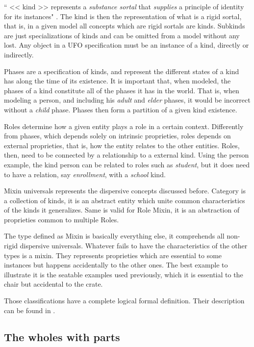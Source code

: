 `` << kind >> represents a \textit{substance sortal} that \textit{supplies} a principle of identity for its instances" \citep{guizzardi_ontological_2005}. The kind is then the representation of what is a rigid sortal, that is, in a given model all concepts which are rigid sortals are kinds. Subkinds are just specializations of kinds and can be omitted from a model without any lost. Any object in a UFO specification must be an instance of a kind, directly or indirectly.

Phases are a specification of kinds, and represent the different states of a kind has along the time of its existence. It is important that, when modeled, the phases of a kind constitute all of the phases it has in the world. That is, when modeling a person, and including his \textit{adult} and \textit{elder} phases, it would be incorrect without a \textit{child} phase. Phases then form a partition of a given kind existence.

Roles determine how a given entity plays a role in a certain context. Differently from phases, which depends solely on intrinsic proprieties, roles depends on external proprieties, that is, how the entity relates to the other entities. Roles, then, need to be connected by a relationship to a external  kind. Using the person example, the kind person can be related to roles such as \textit{student}, but it does need to have a relation, say \textit{enrollment}, with a \textit{school} kind. 

Mixin universals represents the dispersive concepts discussed before. Category is a collection of kinds, it is an abstract entity which unite common characteristics of the kinds it generalizes. Same is valid for Role Mixin, it is an abstraction of proprieties common to multiple Roles. 

The type defined as Mixin is basically everything else, it comprehends all non-rigid dispersive universals. Whatever fails to have the characteristics of the other types is a mixin. They represents proprieties which are essential to some instances but happens accidentally to the other ones. The best example to illustrate it is the seatable examples used previously, which it is essential to the chair but accidental to the crate.

Those classifications have a complete logical formal definition. Their description can be found in \cite{guizzardi_ontological_2005}.

\subsection{The wholes with parts}

